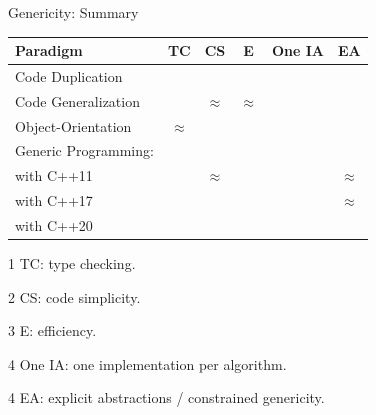 \documentclass[12pt,aspectratio=169]{beamer}
\newcommand{\cmark}{\ding{51}}%
\newcommand{\xmark}{\ding{55}}%
\newcommand{\eqmark}{{\bf \(\approx\)}}
\begin{document}
\begin{frame}[fragile]{Genericity: Summary}
  \begin{table}[htbp]
    \centering
    \small
    \begin{threeparttable}
      \begin{tabular}[width=0.8\linewidth]{l|ccccc}
        Paradigm             & TC\tnote{1} & CS\tnote{2} & E\tnote{3} & One IA\tnote{4} & EA\tnote{5} \\
        \hline
        Code Duplication     & \cmark      & \xmark      & \cmark     & \xmark          & \xmark      \\
        Code Generalization  & \xmark      & \eqmark     & \eqmark    & \cmark          & \xmark      \\
        Object-Orientation   & \eqmark     & \cmark      & \xmark     & \cmark          & \cmark      \\
        Generic Programming: &             &             &            &                 &             \\
        \quad with C++11     & \cmark      & \eqmark     & \cmark     & \cmark          & \eqmark     \\
        \quad with C++17     & \cmark      & \cmark      & \cmark     & \cmark          & \eqmark     \\
        \quad with C++20     & \cmark      & \cmark      & \cmark     & \cmark          & \cmark      \\
      \end{tabular}
      \begin{tablenotes}
        \item[1] TC: type checking.
        \item[2] CS: code simplicity.
        \item[3] E: efficiency.
        \item[4] One IA: one implementation per algorithm.
        \item[4] EA: explicit abstractions / constrained genericity.
      \end{tablenotes}
      \label{table:gen.approaches}
    \end{threeparttable}
  \end{table}
\end{frame}
\end{document}
